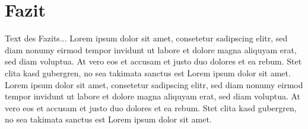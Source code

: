 \section{Fazit}\label{fazit}

Text des Fazits... Lorem ipsum dolor sit amet, consetetur sadipscing elitr, sed diam nonumy eirmod tempor invidunt ut labore et dolore magna aliquyam erat, sed diam voluptua. At vero eos et accusam et justo duo dolores et ea rebum. Stet clita kasd gubergren, no sea takimata sanctus est Lorem ipsum dolor sit amet. Lorem ipsum dolor sit amet, consetetur sadipscing elitr, sed diam nonumy eirmod tempor invidunt ut labore et dolore magna aliquyam erat, sed diam voluptua. At vero eos et accusam et justo duo dolores et ea rebum. Stet clita kasd gubergren, no sea takimata sanctus est Lorem ipsum dolor sit amet.

\cite{gfg14}
\cite{dtut16}
\cite{gfnips16}
\cite{rjVAE19}
\cite{rp_gml18}
\cite{o_pixel16}
\cite{sp17}
\cite{si18} 